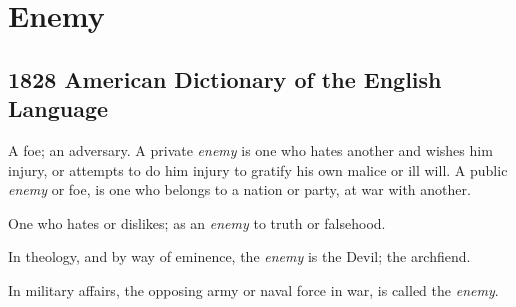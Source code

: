 \section{Enemy}
	\label{ENEMY}
	

\subsection{1828 American Dictionary of the English Language} %
	\label{ENEMY-1828}

	\begin{compactitem}
		\item[1] A foe; an adversary. A private \textit{enemy} is one who hates another and wishes him injury, or attempts to do him injury to gratify his own malice or ill will. A public \textit{enemy} or foe, is one who belongs to a nation or party, at war with another.
		\item[2] One who hates or dislikes; as an \textit{enemy} to truth or falsehood.
		\item[3] In theology, and by way of eminence, the \textit{enemy} is the Devil; the archfiend.
		\item[4] In military affairs, the opposing army or naval force in war, is called the \textit{enemy}.
	\end{compactitem}




